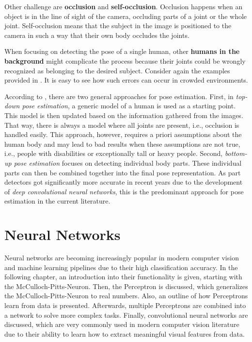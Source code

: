 Other challenge are \textbf{occlusion} and \textbf{self-occlusion}. Occlusion happens when an object is in the line of sight of the camera, occluding parts of a joint or the whole joint.
Self-occlusion means that the subject in the image is positioned to the camera in such a way that their own body occludes the joints.

When focusing on detecting the pose of a single human, other \textbf{humans in the background} might complicate the process because their joints could be wrongly recognized as belonging to the desired subject.
Consider again the examples provided in .
It is easy to see how such errors can occur in crowded environments.

According to \cite{zhu_articulated_2016}, there are two general approaches for pose estimation.
First, in \textit{top-down pose estimation}, a generic model of a human is used as a starting point.
This model is then updated based on the information gathered from the images.
That way, there is always a model where all joints are present, i.e., occlusion is handled easily.
This approach, however, requires a priori assumptions about the human body and may lead to bad results when these assumptions are not true, i.e., people with disabilities or exceptionally tall or heavy people.
Second, \textit{bottom-up pose estimation} focuses on detecting individual body parts.
These individual parts can then be combined together into the final pose representation.
As part detectors got significantly more accurate in recent years due to the development of \textit{deep convolutional neural networks}, this is the predominant approach for pose estimation in the current literature.


\section{Neural Networks}
\label{sec:neural_networks}
Neural networks are becoming increasingly popular in modern computer vision and machine learning pipelines due to their high classification accuracy.
In the following chapter, an introduction into their functionality is given, starting with the McCulloch-Pitts-Neuron.
Then, the Perceptron is discussed, which generalizes the McCulloch-Pitts-Neuron to real numbers.
Also, an outline of how Perceptrons learn from data is presented.
Afterwards, multiple Perceptrons are combined into a network to solve more complex tasks.
Finally, convolutional neural networks are discussed, which are very commonly used in modern computer vision literature due to their ability to learn how to extract meaningful visual features from data.

